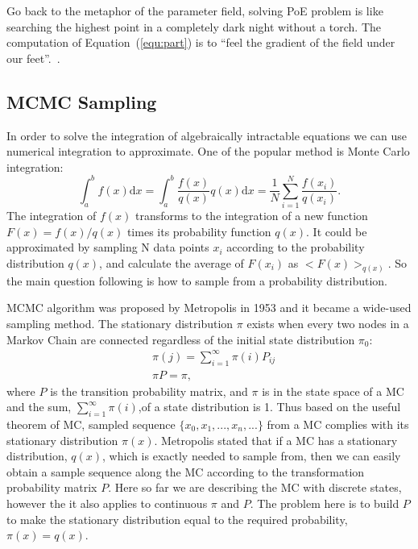 \documentclass[11pt,twoside,a4paper]{article}
\def\D{\mathrm{d}}
\begin{document}
	Go back to the metaphor of the parameter field, solving PoE problem is like searching the highest point in a completely dark night without a torch.
	The computation of Equation~(\ref{equ:part}) is to ``feel the gradient of the field under our feet''.~\cite{woodfordnotes}.
\subsection{MCMC Sampling}
	\label{sec:mcmc}
	In order to solve the integration of algebraically intractable equations we can use numerical integration to approximate.
	One of the popular method is Monte Carlo integration:
	\begin{equation}
	\int_{a}^{b} f(x) \D x = \int_{a}^{b}\frac{f(x)}{q(x)}q(x)\D x = \dfrac{1}{N}\sum_{i=1}^{N}\frac{f(x_i)}{q(x_i)}.
	\end{equation}
	The integration of $ f(x) $ transforms to the integration of a new function $ F(x) = f(x)/q(x)  $ times its probability function $ q(x) $.
	It could be approximated by sampling N data points $ x_i $ according to the probability distribution $ q(x) $, and calculate the average of $ F(x_i) $ as $ <F(x)>_{q(x)}$.
	So the main question following is how to sample from a probability distribution.
	
	MCMC algorithm was proposed by Metropolis in 1953 and it became a wide-used sampling method.
	The stationary distribution $ \pi $ exists when every two nodes in a Markov Chain are connected regardless of the initial state distribution $ \pi_0 $:
	\begin{equation}
	\begin{aligned}
		&\pi(j) = \sum_{i=1}^{\infty}\pi(i)P_{ij} \\
		&\pi P = \pi,
	\end{aligned}
	\end{equation}
	where $ P $ is the transition probability matrix, and $ \pi $ is in the state space of a MC and the sum, $ \sum_{i=1}^{\infty}\pi(i) $,of a state distribution is 1.
	Thus based on the useful theorem of MC, sampled sequence $ \{x_0, x_1, ..., x_n, ... \}$ from a MC complies with its stationary distribution $ \pi(x) $.
	Metropolis stated that if a MC has a stationary distribution, $ q(x) $, which is exactly needed to sample from, then we can easily obtain a sample sequence along the MC according to the transformation probability matrix $ P $.
	Here so far we are describing the MC with discrete states, however the it also applies to continuous $ \pi $ and $ P $.
	The problem here is to build $ P $ to make the stationary distribution equal to the required probability, $ \pi(x) = q(x) $.
	
\end{document}
